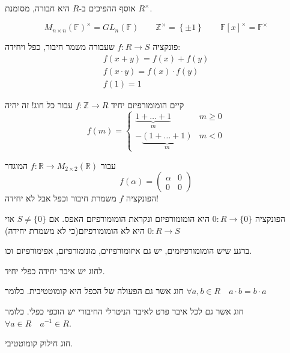 \documentclass{tstextbook}
\begin{document}
\begin{proposition}
אוסף ההפיכים ב-\(R\) היא חבורה, מסומנת \(R^\times\).

\end{proposition}
\begin{example}
$$M_{n\times n}\left( \mathbb{F} \right)^\times=GL_{n}\left( \mathbb{F} \right)\qquad \mathbb{Z} ^\times=\left\{  \pm 1  \right\}\qquad \mathbb{F}[x]^\times=\mathbb{F}^\times$$

\end{example}
\begin{definition}
פונקציה \(f:R\to S\) שעבורה משמר חיבור, כפל ויחידה: 
$$\begin{gathered}f(x+y)=f(x)+f(y) \\f\left( x\cdot y \right)=f(x)\cdot f(y) \\f(1)=1
\end{gathered}$$

\end{definition}
\begin{example}
קיים הומומורפיזם יחיד \(f:\mathbb{Z} \to R\) עבור כל חוג! זה יהיה
$$f(m)=\begin{cases}\underbrace{ 1+\dots+1 }_{ m }  & m\geq 0\\-\underbrace{ \left( 1+\dots+1 \right) }_{ m  } & m<0
\end{cases}$$

\end{example}
\begin{example}
עבור \(f:\mathbb{R} \to M_{2\times 2}\left( \mathbb{R}  \right)\) המוגדר
$$f\left( \alpha \right)=\begin{pmatrix}\alpha & 0 \\0 & 0
\end{pmatrix}$$
הפונקציה \(f\) משמרת חיבור וכפל אבל לא יחידה!

\end{example}
\begin{example}
הפונקציה \(0:R\to \{ 0 \}\) היא הומומורפיזם ונקראת הומומורפיזם האפס. אם \(S\neq \{ 0 \}\) אזי \(0:R\to S\) היא לא הומומורפיזם(כי לא משמרת יחידה)

\end{example}
\begin{remark}
ברגע שיש הומומורפיזמים, יש גם איזומורפיזים, מונומורפיזם, אפימורפיזם וכו.

\end{remark}
\begin{proposition}
לחוג יש איבר יחידה כפלי יחיד.

\end{proposition}
\begin{definition}
חוג אשר גם הפעולה של הכפל היא קומוטטיבית. כלומר \(\forall a,b \in R\quad a\cdot b=b\cdot a\)

\end{definition}
\begin{definition}
חוג אשר גם לכל איבר פרט לאיבר הניטרלי החיבורי יש הוכפי כפלי. כלומר \(\forall a \in R\quad a^{-1}\in R\).

\end{definition}
\begin{definition}[שדה]
חוג חילוק קומוטטיבי.

\end{definition}
\end{document}

